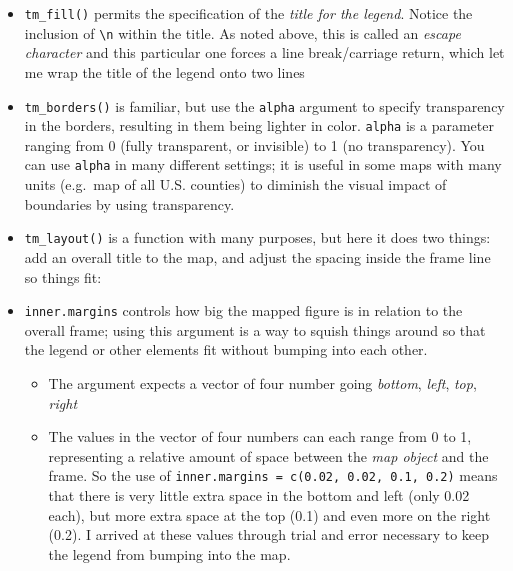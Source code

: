 \documentclass[
]{book}
\providecommand{\tightlist}{%
  \setlength{\itemsep}{0pt}\setlength{\parskip}{0pt}}
\begin{document}
\begin{itemize}
\tightlist
\item
  \texttt{tm\_fill()} permits the specification of the \emph{title for the legend}. Notice the inclusion of \texttt{\textbackslash{}n} within the title. As noted above, this is called an \emph{escape character} and this particular one forces a line break/carriage return, which let me wrap the title of the legend onto two lines
\item
  \texttt{tm\_borders()} is familiar, but use the \texttt{alpha} argument to specify transparency in the borders, resulting in them being lighter in color. \texttt{alpha} is a parameter ranging from 0 (fully transparent, or invisible) to 1 (no transparency). You can use \texttt{alpha} in many different settings; it is useful in some maps with many units (e.g.~map of all U.S. counties) to diminish the visual impact of boundaries by using transparency.
\item
  \texttt{tm\_layout()} is a function with many purposes, but here it does two things: add an overall title to the map, and adjust the spacing inside the frame line so things fit:
\item
  \texttt{inner.margins} controls how big the mapped figure is in relation to the overall frame; using this argument is a way to squish things around so that the legend or other elements fit without bumping into each other.

  \begin{itemize}
  \tightlist
  \item
    The argument expects a vector of four number going \emph{bottom}, \emph{left}, \emph{top}, \emph{right}
  \item
    The values in the vector of four numbers can each range from 0 to 1, representing a relative amount of space between the \emph{map object} and the frame. So the use of \texttt{inner.margins\ =\ c(0.02,\ 0.02,\ 0.1,\ 0.2)} means that there is very little extra space in the bottom and left (only 0.02 each), but more extra space at the top (0.1) and even more on the right (0.2). I arrived at these values through trial and error necessary to keep the legend from bumping into the map.
  \end{itemize}
\end{itemize}
\end{document}
